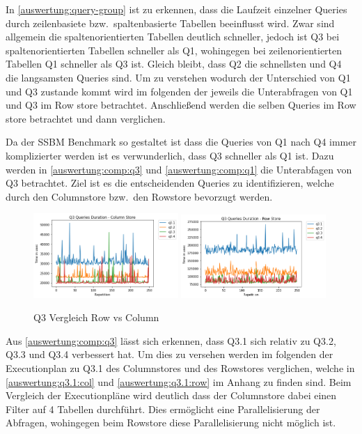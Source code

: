In \autoref{auswertung:query-group} ist zu erkennen, dass die
Laufzeit einzelner Queries durch zeilenbasiete bzw.\ spaltenbasierte
Tabellen beeinflusst wird. Zwar sind allgemein die spaltenorientierten Tabellen
deutlich schneller, jedoch ist Q3 bei spaltenorientierten
Tabellen schneller als Q1, wohingegen bei zeilenorientierten Tabellen
Q1 schneller als Q3 ist.
Gleich bleibt, dass Q2 die schnellsten und Q4 die langsamsten Queries sind.
Um zu verstehen wodurch der Unterschied von Q1 und Q3 zustande kommt wird
im folgenden der jeweils die Unterabfragen von Q1 und Q3 im Row store betrachtet.
Anschließend werden die selben Queries im Row store betrachtet und
dann verglichen.

Da der SSBM Benchmark so gestaltet ist dass die Queries
von Q1 nach Q4 immer komplizierter werden ist es verwunderlich,
dass Q3 schneller als Q1 ist.
Dazu werden in \autoref{auswertung:comp:q3} und \autoref{auswertung:comp:q1}
die Unterabfagen von Q3 betrachtet.
Ziel ist es die entscheidenden Queries zu identifizieren, welche
durch den Columnstore bzw.\ den Rowstore bevorzugt werden.

\begin{figure}[H]
	\centering
	\includegraphics[width=0.49\textwidth]{images/q3-col.png}
	\includegraphics[width=0.49\textwidth]{images/q3-row.png}
	\caption{Q3 Vergleich Row vs Column}\label{auswertung:comp:q3}
\end{figure}

Aus \autoref{auswertung:comp:q3} lässt sich erkennen, dass Q3.1 sich relativ
zu Q3.2, Q3.3 und Q3.4 verbessert hat.
Um dies zu versehen werden im folgenden der Executionplan zu Q3.1 des Columnstores
und des Rowstores verglichen, welche in \autoref{auswertung:q3.1:col} und 
\autoref{auswertung:q3.1:row} im Anhang zu finden sind.
Beim Vergleich der Executionpläne wird deutlich dass der Columnstore dabei
einen Filter auf 4 Tabellen durchführt.
Dies ermöglicht eine Parallelisierung der Abfragen,
wohingegen beim Rowstore diese Parallelisierung nicht möglich ist.

